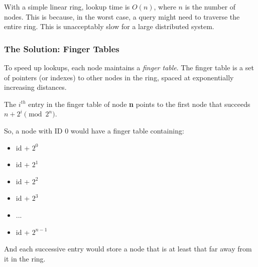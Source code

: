 With a simple linear ring, lookup time is $O(n)$, where $n$ is the number of nodes.  This is because, in the worst case, a query might need to traverse the entire ring.  This is unacceptably slow for a large distributed system.

\subsubsection{The Solution: Finger Tables}

To speed up lookups, each node maintains a \textit{finger table}.  The finger table is a set of pointers (or indexes) to other nodes in the ring, spaced at exponentially increasing distances.

The $i^{th}$ entry in the finger table of node \textbf{n} points to the first node that succeeds $n + 2^i \pmod{2^n}$.

So, a node with ID 0 would have a finger table containing:
\begin{itemize}[itemsep=1pt, topsep=1pt]
    \item id + $2^0$
    \item id + $2^1$
    \item id + $2^2$
    \item id + $2^3$
    \item ...
    \item id + $2^{n-1}$
\end{itemize}
And each successive entry would store a node that is at least that far away from it in the ring.

